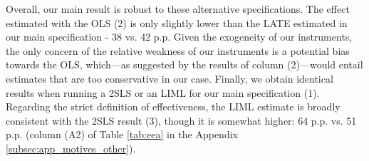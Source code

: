 \documentclass[12pt]{article} %
\begin{document}

Overall, our main result is robust to these alternative specifications. The effect estimated with the OLS (2) is only slightly lower than the LATE estimated in our main specification - 38 vs. 42 p.p. Given the exogeneity of our instruments, the only concern of the relative weakness of our instruments is a potential bias towards the OLS, which---as suggested by the results of column (2)---would entail estimates that are too conservative in our case.  Finally, we obtain identical results when running a 2SLS or an LIML for our main specification (1). Regarding the strict definition of effectiveness, the LIML estimate is broadly consistent with the 2SLS result (3), though it is somewhat higher: 64 p.p. vs. 51 p.p. (column (A2) of Table \ref{tab:eea} in the Appendix \ref{subsec:app_motives_other}).



\end{document}
